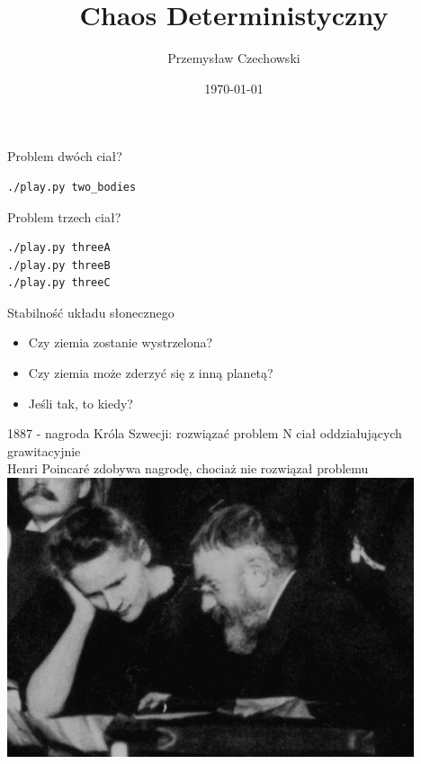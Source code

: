 \documentclass{beamer}
\begin{document}
\title{Chaos Deterministyczny} 
\author{Przemysław Czechowski} 
\date{\today} 

\frame{\titlepage} 

\begin{frame}[fragile]
Problem dwóch ciał?\pause
\begin{lstlisting}
./play.py two_bodies
\end{lstlisting}
\end{frame}

\begin{frame}[fragile]
Problem trzech ciał?\pause
\begin{lstlisting}
./play.py threeA
./play.py threeB
./play.py threeC
\end{lstlisting}
\end{frame}

\begin{frame}{Stabilność układu słonecznego}\pause
\begin{itemize}
\item Czy ziemia zostanie wystrzelona?\pause
\item Czy ziemia może zderzyć się z inną planetą?\pause
\item Jeśli tak, to kiedy?\pause
\end{itemize} 

1887 - nagroda Króla Szwecji: rozwiązać problem N ciał oddziałujących grawitacyjnie\pause\\
Henri Poincaré zdobywa nagrodę, chociaż nie rozwiązał problemu\\
\pause
\centering
\includegraphics[height=0.4\textheight]{poincare_curie}
\end{frame}
\end{document}
